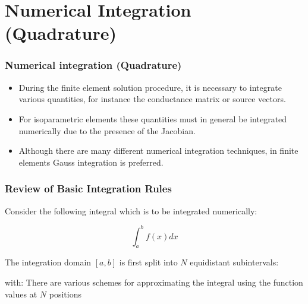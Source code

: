 \documentclass[notes]{beamer}
\begin{document}

\section{Numerical Integration (Quadrature)}
\begin{frame}
\frametitle{Numerical integration (Quadrature)}
\begin{itemize}
	\item During the finite element solution procedure, it is necessary to integrate various quantities,	for instance the conductance matrix or source vectors. 
	\item For isoparametric elements these
	quantities must in general be integrated numerically due to the presence of the Jacobian.
	\item Although there are many different numerical integration techniques, in finite elements
	Gauss integration is preferred.
\end{itemize}
\end{frame}

\begin{frame}
\frametitle{Review of Basic Integration Rules}
Consider the following integral which is to be integrated numerically:

\begin{equation*}
	\int_a^b f(x)dx
\end{equation*}

The integration domain $[a, b]$ is first split into $N$ equidistant subintervals:

with:
There are various schemes for approximating the integral using the function values at $N$ positions
\end{frame}
\end{document}
